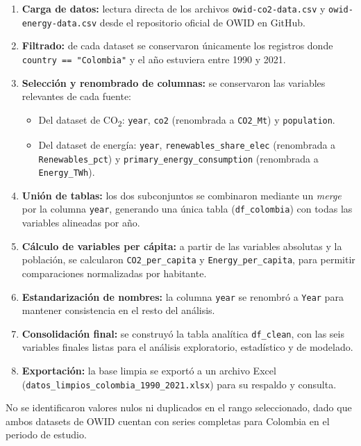 \documentclass[11pt]{article}
\begin{document}
\begin{enumerate}[leftmargin=1.2cm]
    \item \textbf{Carga de datos:} lectura directa de los archivos \texttt{owid-co2-data.csv} y \texttt{owid-energy-data.csv} desde el repositorio oficial de OWID en GitHub.
    \item \textbf{Filtrado:} de cada dataset se conservaron únicamente los registros donde \texttt{country == "Colombia"} y el año estuviera entre 1990 y 2021.
    \item \textbf{Selección y renombrado de columnas:} se conservaron las variables relevantes de cada fuente:
    \begin{itemize}
        \item Del dataset de CO\textsubscript{2}: \texttt{year}, \texttt{co2} (renombrada a \texttt{CO2\_Mt}) y \texttt{population}.
        \item Del dataset de energía: \texttt{year}, \texttt{renewables\_share\_elec} (renombrada a \texttt{Renewables\_pct}) y \texttt{primary\_energy\_consumption} (renombrada a \texttt{Energy\_TWh}).
    \end{itemize}
    \item \textbf{Unión de tablas:} los dos subconjuntos se combinaron mediante un \textit{merge} por la columna \texttt{year}, generando una única tabla (\texttt{df\_colombia}) con todas las variables alineadas por año.
    \item \textbf{Cálculo de variables per cápita:} a partir de las variables absolutas y la población, se calcularon \texttt{CO2\_per\_capita} y \texttt{Energy\_per\_capita}, para permitir comparaciones normalizadas por habitante.
    \item \textbf{Estandarización de nombres:} la columna \texttt{year} se renombró a \texttt{Year} para mantener consistencia en el resto del análisis.
    \item \textbf{Consolidación final:} se construyó la tabla analítica \texttt{df\_clean}, con las seis variables finales listas para el análisis exploratorio, estadístico y de modelado.
    \item \textbf{Exportación:} la base limpia se exportó a un archivo Excel (\texttt{datos\_limpios\_colombia\_1990\_2021.xlsx}) para su respaldo y consulta.
\end{enumerate}

No se identificaron valores nulos ni duplicados en el rango seleccionado, dado que ambos datasets de OWID cuentan con series completas para Colombia en el periodo de estudio.
\end{document}
